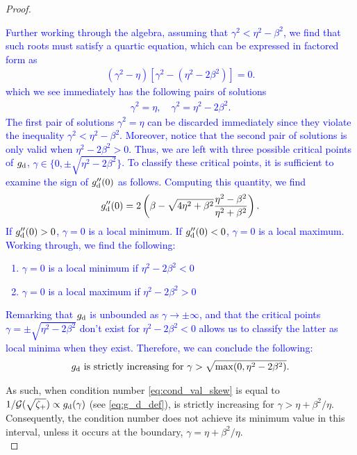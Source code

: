 \documentclass[a4paper,10pt]{article}
\newcommand{\tcb}{\textcolor{blue}}
\begin{document}
{\begin{itemize}
\begin{proof}
\tcb{
Further working through the algebra, assuming that $\gamma^2 < \eta^2 - \beta^2$, we find that such roots must satisfy a quartic equation, which can be expressed in factored form as
\begin{align*}
(\gamma^2 - \eta) \left[\gamma^2 - (\eta^2 - 2 \beta^2) \right] = 0.
\end{align*}
which we see immediately has the following pairs of solutions
\begin{align*}
\gamma^2 = \eta, \quad \gamma^2 = \eta^2 - 2 \beta^2.
\end{align*}
The first pair of solutions $\gamma^2 = \eta$ can be discarded immediately since they violate the inequality $\gamma^2 < \eta^2 - \beta^2$. Moreover, notice that the second pair of solutions is only valid when $\eta^2 - 2 \beta^2 > 0$.
%
Thus, we are left with three possible critical points of $g_{\rm d}$, $\gamma \in  \{0, \pm \sqrt{\eta^2 - 2 \beta^2} \}$. To classify these critical points, it is sufficient to examine the sign of $g_{\rm d}''(0)$ as follows. Computing this quantity, we find
\begin{align*}
g_{\rm d}''(0) = 2 \left( \beta - \sqrt{4 \eta^2 + \beta^2} \frac{ \eta^2 - \beta^2}{\eta^2 + \beta^2}  \right).
\end{align*}
If $g_{\rm d}''(0) > 0$, $\gamma = 0$ is a local minimum. If $g_{\rm d}''(0) < 0$, $\gamma =  0$ is a local maximum.
%
Working through, we find the following:
\begin{enumerate}
\setlength{\itemsep}{0.5ex}
\item $\gamma = 0$ is a local minimum if $\eta^2 - 2 \beta^2 < 0$
\item $\gamma = 0$ is a local maximum if $\eta^2 - 2 \beta^2 > 0$
\end{enumerate}
Remarking that $g_{\rm d}$ is unbounded as $\gamma \to \pm \infty$, and that the critical points $\gamma = \pm \sqrt{\eta^2 - 2 \beta^2}$ don't exist for $\eta^2 - 2 \beta^2 < 0$ allows us to classify the latter as local minima when they exist. Therefore, we can conclude the following:
\begin{align*}
g_{\rm d} \textrm{ is strictly increasing for } \gamma > \sqrt{\max(0, \eta^2 - 2 \beta^2)}.  
\end{align*}}

As such, when condition number \eqref{eq:cond_val_skew} is equal to $1/{\cal G}(\sqrt{\zeta_+}) \propto g_{\rm d}(\gamma)$ (see \eqref{eq:g_d_def}), is strictly increasing for $\gamma > \eta + \beta^2/\eta$. Consequently, the condition number does not achieve its minimum value in this interval, unless it occurs at the boundary, $\gamma = \eta + \beta^2/\eta$.\\


\end{proof}
\end{itemize}}
\end{document}
